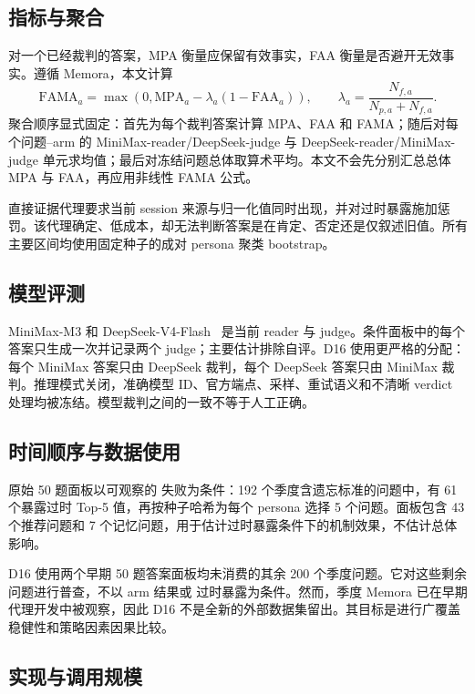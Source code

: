 \subsection{指标与聚合}

对一个已经裁判的答案，MPA 衡量应保留有效事实，FAA 衡量是否避开无效事实。遵循 Memora，本文计算
\[
\mathrm{FAMA}_a=\max\left(0,\mathrm{MPA}_a-\lambda_a(1-\mathrm{FAA}_a)\right),
\qquad
\lambda_a=\frac{N_{f,a}}{N_{p,a}+N_{f,a}}.
\]
聚合顺序显式固定：首先为每个裁判答案计算 MPA、FAA 和 FAMA；随后对每个问题--arm 的 MiniMax-reader/DeepSeek-judge 与 DeepSeek-reader/MiniMax-judge 单元求均值；最后对冻结问题总体取算术平均。本文不会先分别汇总总体 MPA 与 FAA，再应用非线性 FAMA 公式。

直接证据代理要求当前 session 来源与归一化值同时出现，并对过时暴露施加惩罚。该代理确定、低成本，却无法判断答案是在肯定、否定还是仅叙述旧值。所有主要区间均使用固定种子的成对 persona 聚类 bootstrap。

\subsection{模型评测}

MiniMax-M3 和 DeepSeek-V4-Flash~\cite{minimax2026m3,deepseek2026v4} 是当前 reader 与 judge。条件面板中的每个答案只生成一次并记录两个 judge；主要估计排除自评。D16 使用更严格的分配：每个 MiniMax 答案只由 DeepSeek 裁判，每个 DeepSeek 答案只由 MiniMax 裁判。推理模式关闭，准确模型 ID、官方端点、采样、重试语义和不清晰 verdict 处理均被冻结。模型裁判之间的一致不等于人工正确。

\subsection{时间顺序与数据使用}

原始 50 题面板以可观察的 \base 失败为条件：192 个季度含遗忘标准的问题中，有 61 个暴露过时 \base Top-5 值，再按种子哈希为每个 persona 选择 5 个问题。面板包含 43 个推荐问题和 7 个记忆问题，用于估计过时暴露条件下的机制效果，不估计总体影响。

D16 使用两个早期 50 题答案面板均未消费的其余 200 个季度问题。它对这些剩余问题进行普查，不以 arm 结果或 \base 过时暴露为条件。然而，季度 Memora 已在早期代理开发中被观察，因此 D16 不是全新的外部数据集留出。其目标是进行广覆盖稳健性和策略因素因果比较。

\subsection{实现与调用规模}

